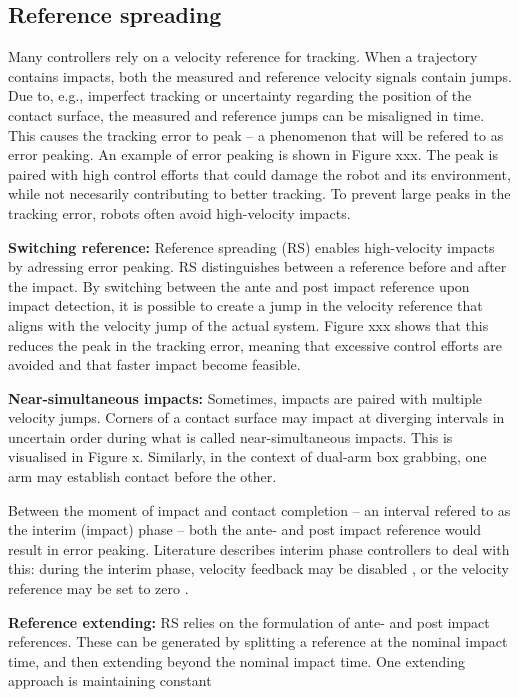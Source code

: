 \documentclass[a4paper, 10pt, conference]{ieeeconf}
\begin{document}
    \subsection{Reference spreading}
    Many controllers rely on a velocity reference for tracking. When a trajectory contains impacts, both the measured and reference velocity signals contain jumps. Due to, e.g., imperfect tracking or uncertainty regarding the position of the contact surface, the measured and reference jumps can be misaligned in time. This causes the tracking error to peak -- a phenomenon that will be refered to as error peaking. An example of error peaking is shown in Figure xxx. The peak is paired with high control efforts that could damage the robot and its environment, while not necesarily contributing to better tracking. To prevent large peaks in the tracking error, robots often avoid high-velocity impacts.

    \textbf{Switching reference:} Reference spreading (RS) enables high-velocity impacts by adressing error peaking. RS distinguishes between a reference before and after the impact. By switching between the ante and post impact reference upon impact detection, it is possible to create a jump in the velocity reference that aligns with the velocity jump of the actual system. Figure xxx shows that this reduces the peak in the tracking error, meaning that excessive control efforts are avoided and that faster impact become feasible.

    \textbf{Near-simultaneous impacts:} Sometimes, impacts are paired with multiple velocity jumps.  Corners of a contact surface may impact at diverging intervals in uncertain order during what is called near-simultaneous impacts. This is visualised in Figure x. Similarly, in the context of dual-arm box grabbing, one arm may establish contact before the other.

    Between the moment of impact and contact completion -- an interval refered to as the interim (impact) phase -- both the ante- and post impact reference would result in error peaking. Literature describes interim phase controllers to deal with this: during the interim phase, velocity feedback may be disabled \cite{vansteenRobotControlSimultaneous2021}, or the velocity reference may be set to zero \cite{uitendaalTeachingRobotsInteraction2022}. 

    \textbf{Reference extending:} RS relies on the formulation of  ante- and post impact references. These can be generated by splitting a reference at the nominal impact time, and then extending beyond the nominal impact time. One extending approach is maintaining constant 
\end{document}
